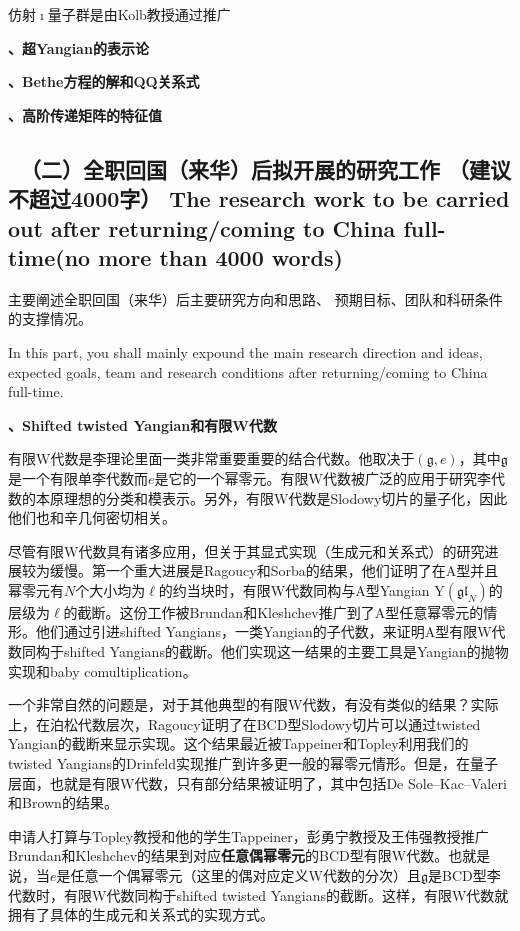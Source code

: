\documentclass[12pt,UTF8,AutoFakeBold=4,a4paper]{ctexart}
\begin{document}
仿射$\imath$量子群是由Kolb教授通过推广

\textbf{、超Yangian的表示论}

\textbf{、Bethe方程的解和QQ关系式}

\textbf{、高阶传递矩阵的特征值}

{\color{MsBlue} \subsection{\sihao \kaishu \quad \ 
\textbf{（二）全职回国（来华）后拟开展的研究工作} （建议不超过4000字） 
\bfseries \xiaosihao {} 
The research work to 
be carried out after returning/coming to China full-time(no more than 4000 words)} 
}

{\sihao \color{MsBlue} \kaishu 主要阐述全职回国（来华）后主要研究方向和思路、
预期目标、团队和科研条件的支撑情况。}

{\color{MsBlue}  
In this part, you shall mainly expound the main research direction and ideas, 
expected goals, team and research conditions after returning/coming to China 
full-time.}

\textbf{、Shifted twisted Yangian和有限W代数}

有限W代数是李理论里面一类非常重要重要的结合代数。他取决于$(\mathfrak g,e)$，其中$\mathfrak g$是一个有限单李代数而$e$是它的一个幂零元。有限W代数被广泛的应用于研究李代数的本原理想的分类和模表示。另外，有限W代数是Slodowy切片的量子化，因此他们也和辛几何密切相关。

尽管有限W代数具有诸多应用，但关于其显式实现（生成元和关系式）的研究进展较为缓慢。第一个重大进展是Ragoucy和Sorba的结果，他们证明了在A型并且幂零元有$N$个大小均为$\ell$的约当块时，有限W代数同构与A型Yangian $\mathrm{Y}(\mathfrak{gl}_N)$的层级为$\ell$的截断。这份工作被Brundan和Kleshchev推广到了A型任意幂零元的情形。他们通过引进shifted Yangians，一类Yangian的子代数，来证明A型有限W代数同构于shifted Yangians的截断。他们实现这一结果的主要工具是Yangian的抛物实现和baby comultiplication。

一个非常自然的问题是，对于其他典型的有限W代数，有没有类似的结果？实际上，在泊松代数层次，Ragoucy证明了在BCD型Slodowy切片可以通过twisted Yangian的截断来显示实现。这个结果最近被Tappeiner和Topley利用我们的twisted Yangians的Drinfeld实现推广到许多更一般的幂零元情形。但是，在量子层面，也就是有限W代数，只有部分结果被证明了，其中包括De Sole–Kac–Valeri和Brown的结果。

申请人打算与Topley教授和他的学生Tappeiner，彭勇宁教授及王伟强教授推广Brundan和Kleshchev的结果到对应\textbf{任意偶幂零元}的BCD型有限W代数。也就是说，当$e$是任意一个偶幂零元（这里的偶对应定义W代数的分次）且$\mathfrak g$是BCD型李代数时，有限W代数同构于shifted twisted Yangians的截断。这样，有限W代数就拥有了具体的生成元和关系式的实现方式。
\end{document}
